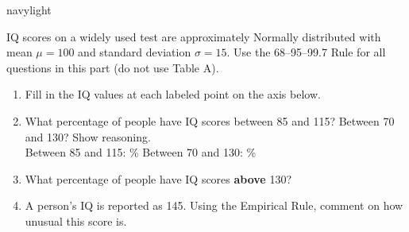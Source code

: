 \documentclass[10pt]{article}
\begin{document}
\begin{blurbbox}{navylight}
\small

IQ scores on a widely used test are approximately Normally distributed with
mean $\mu = 100$ and standard deviation $\sigma = 15$. Use the
68--95--99.7 Rule for all questions in this part (do not use Table A).

\vspace{0.10in}

\begin{enumerate}[leftmargin=1.5em, itemsep=8pt]

  \item Fill in the IQ values at each labeled point on the axis below.\\[6pt]
        \begin{center}
        \end{center}

  \item What percentage of people have IQ scores between 85 and 115?
        Between 70 and 130? Show reasoning.\\[5pt]
        Between 85 and 115: \% \quad Between 70 and 130: \%

  \item What percentage of people have IQ scores \textbf{above} 130?\\[5pt]

  \item A person's IQ is reported as 145. Using the Empirical Rule, comment on how
        unusual this score is.\\[5pt]
        \\[1pt]

\end{enumerate}

\end{blurbbox}
\end{document}
